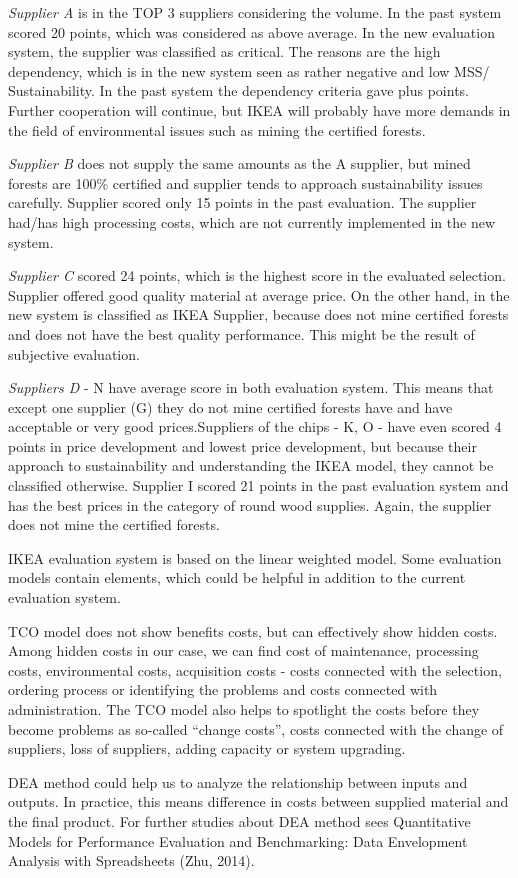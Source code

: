 \documentclass[oneside,12pt]{article}%
\begin{document}
\newline
\emph{Supplier A} is in the TOP 3 suppliers considering the volume. In the past system scored 20 points, which was considered as above average. In the new evaluation system, the supplier was classified as critical. The reasons are the high dependency, which is in the new system seen as rather negative and low MSS/ Sustainability. In the past system the dependency criteria  gave plus points. Further cooperation will continue, but IKEA will probably have more demands in the field of environmental issues such as mining the certified forests. \par
\emph{Supplier B} does not supply the same amounts as the A supplier, but mined forests are 100\% certified and supplier tends to approach sustainability issues carefully. Supplier scored only 15 points in the past evaluation. The supplier had/has high processing costs, which are not currently implemented in the new system. \par
\emph{Supplier C} scored 24 points, which is the highest score in the evaluated selection. Supplier offered good quality material at average price. On the other hand, in the new system is classified as IKEA Supplier, because does not mine certified forests and does not have the best quality performance. This might be the result of subjective evaluation.\par
\emph{Suppliers D} - N have average score in both evaluation system. This means that except one supplier (G) they do not mine certified forests have and have acceptable or very good prices.Suppliers of the chips - K, O -  have even scored 4 points in price development and lowest price development, but because their approach to sustainability and understanding the IKEA model, they cannot be classified otherwise. Supplier I scored 21 points in the past evaluation system and has the best prices in the category of round wood supplies. Again, the supplier does not mine the certified forests.



IKEA evaluation system is based on the linear weighted model. Some evaluation models contain elements, which could be helpful in addition to the current evaluation system. \par
TCO model does not show benefits costs, but can effectively show hidden costs. Among hidden costs in our case, we can find cost of maintenance, processing costs, environmental costs, acquisition costs - costs connected with the selection, ordering process or identifying the problems and costs connected with administration. The TCO model also helps to spotlight the costs before they become problems as so-called  ``change costs'', costs connected with the change of suppliers, loss of suppliers, adding capacity or system upgrading. \par
DEA method could help us to analyze the relationship between inputs and outputs. In practice, this means difference in costs between supplied material and the final product. For further studies about DEA method sees Quantitative Models for Performance Evaluation and Benchmarking: Data Envelopment Analysis with Spreadsheets (Zhu, 2014).
\end{document}
